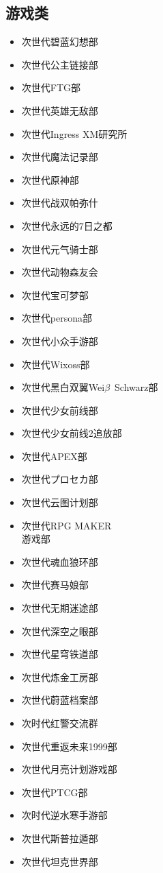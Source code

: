 \documentclass[twoside,12pt]{book}
\newenvironment{categorysection}[1]{
  \subsection*{\textcolor{truepurple}{#1}}
  \begin{itemize}[leftmargin=*, 
                 nosep,               %
                 itemsep=2pt,         %
                 parsep=0pt,          %
                 before=\setlength{\baselineskip}{23pt} %
  ]
}{
  \end{itemize}
}
\begin{document}
\begin{multicols}{3}
\begin{categorysection}{游戏类}
        \item 次世代碧蓝幻想部
        \item 次世代公主链接部
        \item 次世代FTG部
        \item 次世代英雄无敌部
        \item 次世代Ingress XM研究所
        \item 次世代魔法记录部
        \item 次世代原神部
        \item 次世代战双帕弥什
        \item 次世代永远的7日之都
        \item 次世代元气骑士部
        \item 次世代动物森友会
        \item 次世代宝可梦部
        \item 次世代persona部
        \item 次世代小众手游部
        \item 次世代Wixoss部
        \item 次世代黑白双翼Wei$\beta$~Schwarz部
        \item 次世代少女前线部
        \item 次世代少女前线2追放部
        \item 次世代APEX部
        \item 次世代プロセカ部
        \item 次世代云图计划部
        \item 次世代RPG MAKER\\游戏部
        \item 次世代魂血狼环部
        \item 次世代赛马娘部
        \item 次世代无期迷途部
        \item 次世代深空之眼部
        \item 次世代星穹铁道部
        \item 次世代炼金工房部
        \item 次世代蔚蓝档案部
        \item 次时代红警交流群
        \item 次世代重返未来1999部
        \item 次世代月亮计划游戏部
        \item 次世代PTCG部
        \item 次时代逆水寒手游部
        \item 次世代斯普拉遁部
        \item 次世代坦克世界部

\end{categorysection}
\end{multicols}
\end{document}
